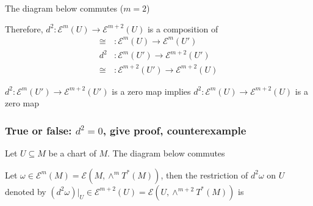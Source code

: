 \documentclass{article}
\begin{document}
The diagram below commutes ($m=2$)

\begin{center}
\end{center}

Therefore, $d^2: \mathcal{E}^m(U) \to \mathcal{E}^{m+2}(U)$ is a composition of 
\begin{align*}
    \cong&: \mathcal{E}^m(U) \to \mathcal{E}^m(U') \\
    d^2&: \mathcal{E}^m(U') \to \mathcal{E}^{m+2}(U') \\
    \cong&: \mathcal{E}^{m+2}(U') \to \mathcal{E}^{m+2}(U)
\end{align*}

$d^2: \mathcal{E}^m(U') \to \mathcal{E}^{m+2}(U')$ is a zero map implies $d^2: \mathcal{E}^m(U) \to \mathcal{E}^{m+2}(U)$ is a zero map

\subsubsection{True or false: $d^2 = 0$, give proof, counterexample}

Let $U \subseteq M$ be a chart of $M$. The diagram below commutes

\begin{center}
\end{center}

Let $\omega \in \mathcal{E}^m(M) = \mathcal{E}(M, \wedge^m T^*(M))$, then the restriction of $d^2 \omega$ on $U$ denoted by $(d^2 \omega) \vert_{U} \in \mathcal{E}^{m+2}(U) = \mathcal{E}(U, \wedge^{m+2} T^*(M))$ is
\end{document}
